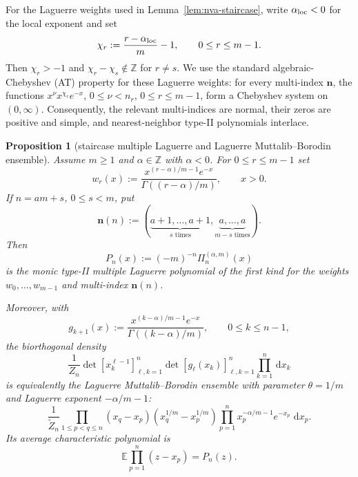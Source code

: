 \documentclass[reqno]{article}
\newtheorem{prop}[theorem]{Proposition}
\theoremstyle{definition}
\theoremstyle{remark}
\theoremstyle{plain}
\newcommand{\dd}{\,\mathrm d}
\begin{document}
For the Laguerre weights used in Lemma~\ref{lem:nva-staircase}, write $\alpha_{\rm loc}<0$ for the local exponent and set
\[
\chi_r:=\frac{r-\alpha_{\rm loc}}{m}-1,\qquad 0\le r\le m-1.
\]
Then $\chi_r>-1$ and $\chi_r-\chi_s\notin\mathbb Z$ for $r\ne s$. We use the standard algebraic-Chebyshev (AT) property for these Laguerre weights: for every multi-index $\boldsymbol n$, the functions $x^\nu x^{\chi_r}e^{-x}$, $0\le \nu<n_r$, $0\le r\le m-1$, form a Chebyshev system on $(0,\infty)$. Consequently, the relevant multi-indices are normal, their zeros are positive and simple, and nearest-neighbor type-II polynomials interlace.

\begin{prop}[staircase multiple Laguerre and Laguerre Muttalib--Borodin ensemble]\label{prop:micro-mop-ensemble}
Assume $m\ge1$ and $\alpha\in\mathbb Z$ with $\alpha<0$. For $0\le r\le m-1$ set
\[
w_r(x):=\frac{x^{(r-\alpha)/m-1}e^{-x}}{\Gamma((r-\alpha)/m)},\qquad x>0.
\]
If $n=am+s$, $0\le s<m$, put
\[
\boldsymbol n(n):=(\underbrace{a+1,\dots,a+1}_{s\text{ times}},\underbrace{a,\dots,a}_{m-s\text{ times}}).
\]
Then
\[
P_n(x):=(-m)^{-n}\Pi_n^{(\alpha,m)}(x)
\]
is the monic type-II multiple Laguerre polynomial of the first kind for the weights $w_0,\dots,w_{m-1}$ and multi-index $\boldsymbol n(n)$.

Moreover, with
\[
g_{k+1}(x):=\frac{x^{(k-\alpha)/m-1}e^{-x}}{\Gamma((k-\alpha)/m)},\qquad 0\le k\le n-1,
\]
the biorthogonal density
\[
\frac1{Z_n}\det[x_k^{\ell-1}]_{\ell,k=1}^n\det[g_\ell(x_k)]_{\ell,k=1}^n\prod_{k=1}^n\dd x_k
\]
is equivalently the Laguerre Muttalib--Borodin ensemble with parameter $\theta=1/m$ and Laguerre exponent $-\alpha/m-1$:
\[
\frac1{\widetilde Z_n}
\prod_{1\le p<q\le n}(x_q-x_p)(x_q^{1/m}-x_p^{1/m})
\prod_{p=1}^n x_p^{-\alpha/m-1}e^{-x_p}\,\dd x_p .
\]
Its average characteristic polynomial is
\[
\mathbb E\prod_{p=1}^n(z-x_p)=P_n(z).
\]
\end{prop}
\end{document}
